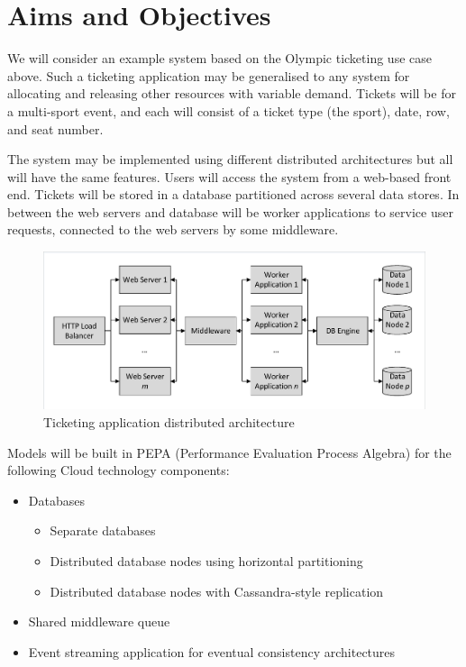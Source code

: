 \documentclass{llncs}
\begin{document}
\section{Aims and Objectives}

We will consider an example system based on the Olympic ticketing use case above.  Such a ticketing application may be generalised to any system for allocating and releasing other resources with variable demand.  Tickets will be for a multi-sport event, and each will consist of a ticket type (the sport), date, row, and seat number.

The system may be implemented using different distributed architectures but all will have the same features.  Users will access the system from a web-based front end.  Tickets will be stored in a database partitioned across several data stores.  In between the web servers and database will be worker applications to service user requests, connected to the web servers by some middleware.

\begin{figure}
	\caption{Ticketing application distributed architecture}
	\centering
	\includegraphics[trim = 5 5 5 5, clip, width=\textwidth]{img/application}
\end{figure}

Models will be built in PEPA (Performance Evaluation Process Algebra) \cite{RN1051} for the following Cloud technology components:

\begin{itemize}
\item Databases
	\begin{itemize}
	\item Separate databases
	\item Distributed database nodes using horizontal partitioning \cite{RN68}
	\item Distributed database nodes with Cassandra-style replication \cite{RN1050}
	\end{itemize}
\item Shared middleware queue \cite{RN65}
\item Event streaming application for eventual consistency architectures \cite{RN1071}
\end{itemize}
\end{document}
